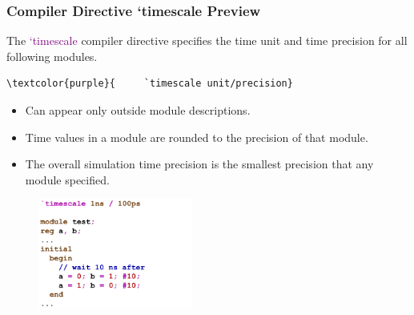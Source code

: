 \documentclass[t, notes, xcolor=table]{beamer}
\begin{document}
\begin{frame}[fragile]
\frametitle{Compiler Directive `timescale Preview}
\scriptsize{
\begin{multicols}{2}
The \textcolor{purple}{`timescale} compiler directive specifies the time unit and time precision for all following modules.
\begin{Verbatim}[commandchars=\\\{\}, tabsize=2]
\textcolor{purple}{		`timescale unit/precision}
\end{Verbatim}
\begin{itemize}
\item Can appear only outside module descriptions.
\item Time values in a module are rounded to the precision of that module.
\item The overall simulation time precision is the smallest precision that any module specified.
\end{itemize}
\vfill
\columnbreak
\begin{figure}
    \includegraphics[width=0.45\textwidth]{img/09_timescale.png}
\end{figure}
\end{multicols}
}
\end{frame}
\end{document}

